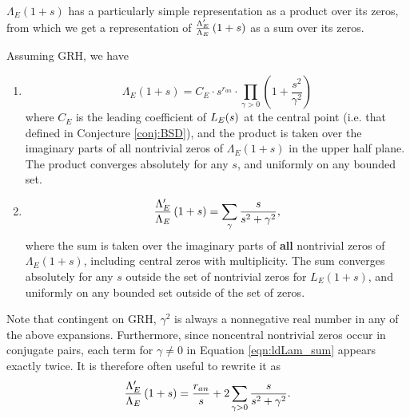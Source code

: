 $\Lambda_E(1+s)$ has a particularly simple representation as a product over its zeros, from which we get a representation of $\frac{\Lambda_E^{\prime}}{\Lambda_E}\left(1+s\right)$ as a sum over its zeros.
\begin{proposition}\label{prop:logderiv_zero_rep}  Assuming GRH, we have
\begin{enumerate}
\item \begin{equation}\label{eqn:Lams_prod}
\Lambda_E(1+s) = C_E\cdot s^{r_{an}} \cdot \prod_{\gamma > 0} \left(1+\frac{s^2}{\gamma^2}\right) 
\end{equation}
where $C_E$ is the leading coefficient of $L_E(s)$ at the central point (i.e. that defined in Conjecture \ref{conj:BSD}), and the product is taken over the imaginary parts of all nontrivial zeros of $\Lambda_E(1+s)$ in the upper half plane. The product converges absolutely for any $s$, and uniformly on any bounded set.
\item \begin{equation}\label{eqn:ldLam_sum}
\frac{\Lambda_E^{\prime}}{\Lambda_E}\left(1+s\right) = \sum_{\gamma} \frac{s}{s^2+\gamma^2}, 
\end{equation}
where the sum is taken over the imaginary parts of {\bf all} nontrivial zeros of $\Lambda_E(1+s)$, including central zeros with multiplicity. The sum converges absolutely for any $s$ outside the set of nontrivial zeros for $L_E(1+s)$, and uniformly on any bounded set outside of the set of zeros. \\
\end{enumerate}
\end{proposition}

Note that contingent on GRH, $\gamma^2$ is always a nonnegative real number in any of the above expansions. Furthermore,  since noncentral nontrivial zeros occur in conjugate pairs, each term for $\gamma \ne 0$ in Equation \ref{eqn:ldLam_sum} appears exactly twice. It is therefore often useful to rewrite it as
\begin{equation}\label{eqn:ldLam_sum_v2}
\frac{\Lambda_E^{\prime}}{\Lambda_E}\left(1+s\right) = \frac{r_{an}}{s} + 2 \sum_{\gamma>0} \frac{s}{s^2+\gamma^2}.
\end{equation}

